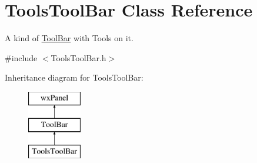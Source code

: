 \hypertarget{class_tools_tool_bar}{}\section{Tools\+Tool\+Bar Class Reference}
\label{class_tools_tool_bar}


A kind of \hyperlink{class_tool_bar}{Tool\+Bar} with Tools on it.  




{\ttfamily \#include $<$Tools\+Tool\+Bar.\+h$>$}

Inheritance diagram for Tools\+Tool\+Bar\+:\begin{figure}[H]
\begin{center}
\leavevmode
\includegraphics[height=3.000000cm]{class_tools_tool_bar}
\end{center}
\end{figure}
